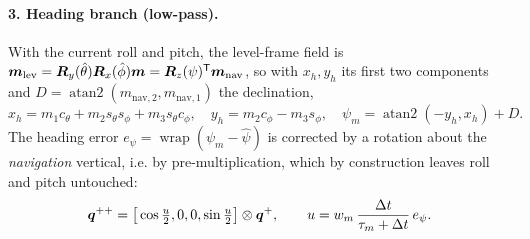 \paragraph{3. Heading branch (low-pass).} With the current roll and pitch, the level-frame field is
$\bm{m}_{\text{lev}}=\bm{R}_y(\hat\theta)\bm{R}_x(\hat\phi)\bm{m}=\bm{R}_z(\psi)^{\mathsf{T}}\bm{m}_{\text{nav}}$,
so with $x_h,y_h$ its first two components and $D=\operatorname{atan2}(m_{\text{nav},2},m_{\text{nav},1})$
the declination,
\begin{equation}
x_h = m_1 c_\theta + m_2 s_\theta s_\phi + m_3 s_\theta c_\phi,\quad
y_h = m_2 c_\phi - m_3 s_\phi,\quad
\psi_m = \operatorname{atan2}(-y_h,x_h) + D .
\label{eq:cf-head}
\end{equation}
The heading error $e_\psi = \operatorname{wrap}(\psi_m-\hat\psi)$ is corrected by a rotation about
the \emph{navigation} vertical, i.e. by pre-multiplication, which by construction leaves roll and
pitch untouched:
\begin{equation}
\bm{q}^{++} = \big[\cos\tfrac{u}{2},0,0,\sin\tfrac{u}{2}\big]\otimes\bm{q}^+ ,\qquad
u = w_m\,\frac{\Delta t}{\tau_m+\Delta t}\,e_\psi .
\label{eq:cf-headblend}
\end{equation}

